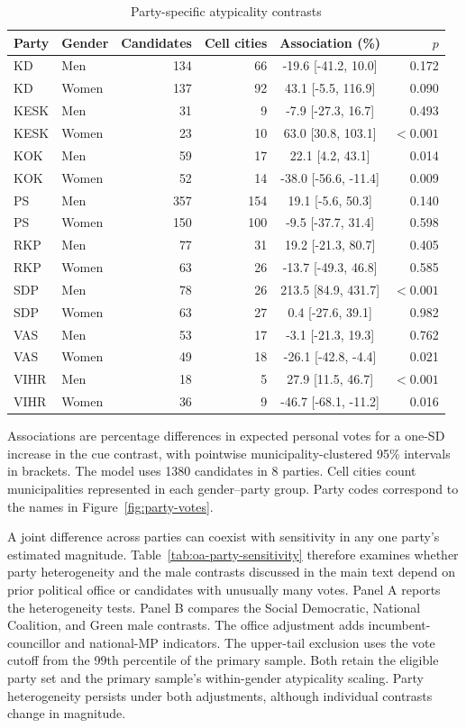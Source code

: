 \documentclass[11pt,a4paper]{article}\usepackage[]{graphicx}\usepackage[]{xcolor}
\begin{document}
\begin{table}[!htbp]
\centering\small
\caption{Party-specific atypicality contrasts}
\label{tab:oa-party}
\begin{tabular}{llrrcr}
\toprule
Party & Gender & Candidates & Cell cities & Association (\%) & $p$ \\
\midrule
KD & Men & 134 & 66 & -19.6 [-41.2, 10.0] & 0.172 \\
KD & Women & 137 & 92 & 43.1 [-5.5, 116.9] & 0.090 \\
KESK & Men & 31 & 9 & -7.9 [-27.3, 16.7] & 0.493 \\
KESK & Women & 23 & 10 & 63.0 [30.8, 103.1] & $<0.001$ \\
KOK & Men & 59 & 17 & 22.1 [4.2, 43.1] & 0.014 \\
KOK & Women & 52 & 14 & -38.0 [-56.6, -11.4] & 0.009 \\
PS & Men & 357 & 154 & 19.1 [-5.6, 50.3] & 0.140 \\
PS & Women & 150 & 100 & -9.5 [-37.7, 31.4] & 0.598 \\
RKP & Men & 77 & 31 & 19.2 [-21.3, 80.7] & 0.405 \\
RKP & Women & 63 & 26 & -13.7 [-49.3, 46.8] & 0.585 \\
SDP & Men & 78 & 26 & 213.5 [84.9, 431.7] & $<0.001$ \\
SDP & Women & 63 & 27 & 0.4 [-27.6, 39.1] & 0.982 \\
VAS & Men & 53 & 17 & -3.1 [-21.3, 19.3] & 0.762 \\
VAS & Women & 49 & 18 & -26.1 [-42.8, -4.4] & 0.021 \\
VIHR & Men & 18 & 5 & 27.9 [11.5, 46.7] & $<0.001$ \\
VIHR & Women & 36 & 9 & -46.7 [-68.1, -11.2] & 0.016 \\
\bottomrule
\end{tabular}
\begin{minipage}{\linewidth}\footnotesize
Associations are percentage differences in expected personal votes for a one-SD increase in the cue contrast, with pointwise municipality-clustered 95\% intervals in brackets. The model uses 1380 candidates in 8 parties. Cell cities count municipalities represented in each gender--party group. Party codes correspond to the names in Figure~\ref{fig:party-votes}.
\end{minipage}
\end{table}

A joint difference across parties can coexist with sensitivity in any one party's estimated magnitude. Table~\ref{tab:oa-party-sensitivity} therefore examines whether party heterogeneity and the male contrasts discussed in the main text depend on prior political office or candidates with unusually many votes. Panel A reports the heterogeneity tests. Panel B compares the Social Democratic, National Coalition, and Green male contrasts. The office adjustment adds incumbent-councillor and national-MP indicators. The upper-tail exclusion uses the vote cutoff from the 99th percentile of the primary sample. Both retain the eligible party set and the primary sample's within-gender atypicality scaling. Party heterogeneity persists under both adjustments, although individual contrasts change in magnitude.
\end{document}
